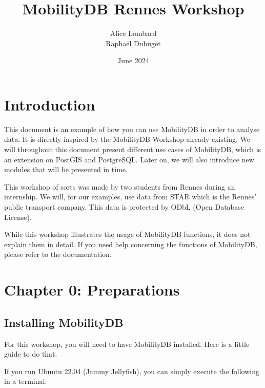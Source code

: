 \documentclass{article}
\title{MobilityDB Rennes Workshop}
\author{Alice Lombard\\ Raphaël Dubuget}
\date{June 2024}
\begin{document}
\maketitle

\tableofcontents
\newpage

\section*{Introduction}

This document is an example of how you can use MobilityDB in order to analyse data. It is directly inspired by the MobilityDB Workshop\cite{Workshop} already existing. We will throughout this document present different use cases of MobilityDB, which is an extension on PostGIS and PostgreSQL. Later on, we will also introduce new modules that will be presented in time.

This workshop of sorts was made by two students from Rennes during an internship. We will, for our examples, use data from STAR which is the Rennes' public transport company. This data is protected by ODbL (Open Database License)\cite{SourceSTAR}.

While this workshop illustrates the usage of MobilityDB functions, it does not explain them in detail. If you need help concerning the functions of MobilityDB, please refer to the documentation\cite{docMoDB}. 

\vspace{1cm}

\section*{Chapter 0: Preparations}

\subsection{Installing MobilityDB}

For this workshop, you will need to have MobilityDB installed. Here is a little guide to do that.

If you run Ubuntu 22.04 (Jammy Jellyfish), you can simply execute the following in a terminal:
\end{document}
